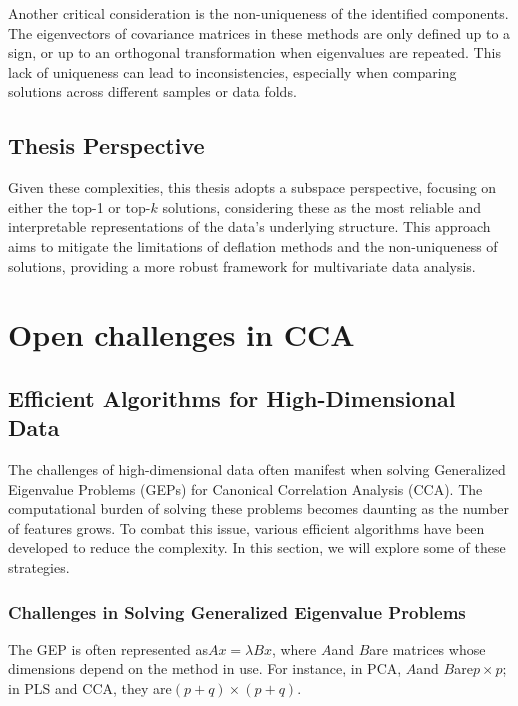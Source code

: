 Another critical consideration is the non-uniqueness of the identified components.
The eigenvectors of covariance matrices in these methods are only defined up to a sign, or up to an orthogonal transformation when eigenvalues are repeated. This lack of uniqueness can lead to inconsistencies, especially when comparing solutions across different samples or data folds.

\subsection{Thesis Perspective}

Given these complexities, this thesis adopts a subspace perspective, focusing on either the top-1 or top-$k$ solutions, considering these as the most reliable and interpretable representations of the data's underlying structure.
This approach aims to mitigate the limitations of deflation methods and the non-uniqueness of solutions, providing a more robust framework for multivariate data analysis.

\section{Open challenges in CCA}

\subsection{Efficient Algorithms for High-Dimensional Data}

The challenges of high-dimensional data often manifest when solving Generalized Eigenvalue Problems (GEPs) for Canonical Correlation Analysis (CCA). The computational burden of solving these problems becomes daunting as the number of features grows. To combat this issue, various efficient algorithms have been developed to reduce the complexity. In this section, we will explore some of these strategies.

\subsubsection{Challenges in Solving Generalized Eigenvalue Problems}

The GEP is often represented as\( Ax = \lambda Bx \), where \( A \)and \( B \)are matrices whose dimensions depend on the method in use.
For instance, in PCA, \( A \)and \( B \)are\( p \times p \); in PLS and CCA, they are\( (p+q) \times (p+q) \).

